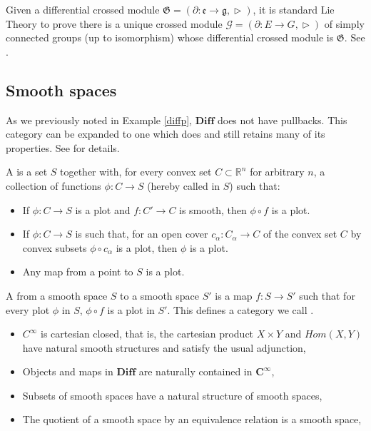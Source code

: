  Given a differential crossed module $\mathfrak{G}=(\partial:\mathfrak{e}\rightarrow\mathfrak{g},\vartriangleright)$, it is standard Lie Theory to prove there is a unique crossed module $\mathcal{G}=(\partial:E\rightarrow G,\vartriangleright)$ of simply connected groups (up to isomorphism) whose differential crossed module is $\mathfrak{G}$. See \cite[p. 10]{picken_faria}.

\subsection{Smooth spaces}

As we previously noted in Example \ref{diffp}, $\mathbf{Diff}$ does not have pullbacks. This category can be expanded to one which does and still retains many of its properties. See \cite{baezsmooth} for details.
\begin{definition}
A  is a set $S$ together with, for every convex set $C\subset \mathbb{R}^n$ for arbitrary $n$, a collection of functions $\phi:C\rightarrow S$ (hereby called  in $S$) such that:
\begin{itemize}
 \item If $\phi:C\rightarrow S$ is a plot and $f:C'\rightarrow C$ is smooth, then $\phi\circ f$ is a plot.
\item If $\phi:C\rightarrow S$ is such that, for an open cover $c_\alpha:C_\alpha\rightarrow C$ of the convex set $C$ by convex subsets $\phi\circ c_\alpha$ is a plot, then $\phi$ is a plot.
\item Any map from a point to $S$ is a plot.
\end{itemize}

A  from a smooth space $S$ to a smooth space $S'$ is a map $f:S\rightarrow S'$ such that for every plot $\phi$ in $S$, $\phi\circ f$ is a plot in $S'$.
This defines a category we call .
\end{definition}
\begin{prop}\label{smoothprop}
\begin{itemize}
 \item $C^\infty$ is cartesian closed, that is, the cartesian product $X\times Y$ and $Hom(X,Y)$ have natural smooth structures and satisfy the usual adjunction,
\item Objects and maps in $\mathbf{Diff}$ are naturally contained in $\mathbf{C^{\infty}}$,
\item Subsets of smooth spaces have a natural structure of smooth spaces,\label{restrict}
\item The quotient of a smooth space by an equivalence relation is a smooth space,
\end{itemize} 
\end{prop}

